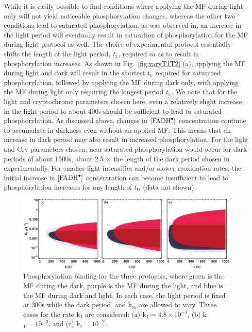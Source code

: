 \documentclass[twoside,twocolumn,9pt]{article}
\begin{document}
While it is easily possible to find conditions where applying the MF during light only will not yield noticeable phosphorylation
changes, whereas the other two conditions lead to saturated phosphorylation, as was observed in, \cite{Hammad2019} an increase in
the light period will eventually result in saturation of phosphorylation for the MF during light protocol as well. The choice of
experimental protocol essentially shifts the length of the light period, $t_{\textsc{l}}$, required so as to result in
phosphorylation increases. As shown in Fig.~\ref{fig:varyT1T2} (a), applying the MF during light and dark will result in the
shortest $t_{\textsc{l}}$ required for saturated phosphorylation, followed by applying the MF during dark only, with applying the MF
during light only requiring the longest period $t_{\textsc{l}}$. We note that for the light and cryptochrome parameters chosen here,
even a relatively slight increase in the light period to about 400s should be sufficient to lead to saturated phosphorylation. As
discussed above, changes in $[\ce{FADH^{.}}]$ concentration continue to accumulate in darkness even without an applied MF. This
means that an increase in dark period may also result in increased phosphorylation. For the light and Cry parameters chosen, near
saturated phosphorylation would occur for dark periods of about 1500s, about 2.5 $\times$ the length of the dark period chosen in
experimentally. \cite{Pooam2019, Hammad2019} For smaller light intensities and/or slower reoxidation rates, the initial increase in
$[\ce{FADH^{.}}]$ concentration can become insufficient to lead to phosphorylation increases for any length of $t_{\textsc{d}}$
(data not shown).
\begin{figure}[h]
	\centering
	\includegraphics[width = 2\columnwidth]{PhosK1bTL.pdf}
	\caption{Phosphorylation binding for the three protocols, where green is the MF during the dark, purple is the MF during the
		light, and blue is the MF during dark and light. In each case, the light period is fixed at 300s while the dark period, and 
		k$_{1b}$ are allowed to vary. Three cases for the rate k$_{1}$ are considered: (a) k$_{1} = 4.8 \times 10^{-4}$, (b) k$_{1} 
		= 10^{-3}$, and (c) k$_{1} = 10^{-2}$.}
	\label{fig:PvsK1bTLight}
\end{figure}
\end{document}
